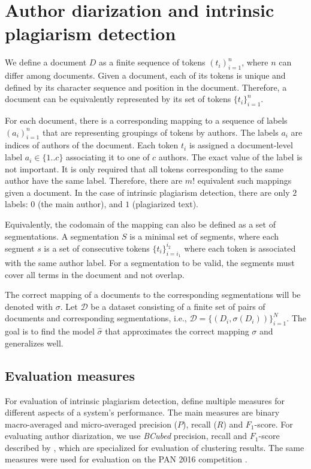 \documentclass[10pt, a4paper]{article}
\begin{document}
\section{Author diarization and intrinsic plagiarism detection} \label{sec:author-diraization}

We define a document $D$ as a finite sequence of tokens $(t_i)_{i=1}^n$, where $n$ can differ among documents. Given a document, each of its tokens is unique and defined by its character sequence and position in the document. Therefore, a document can be equivalently represented by its set of tokens $\{t_i\}_{i=1}^n$.

For each document, there is a corresponding mapping to a sequence of labels $(a_i)_{i=1}^n$ that are representing groupings of tokens by authors. The labels $a_i$ are indices of authors of the document. Each token $t_i$ is assigned a document-level label $a_i \in \{1..c\}$ associating it to one of $c$ authors. The exact value of the label is not important. It is only required that all tokens corresponding to the same author have the same label. Therefore, there are $m!$ equivalent such mappings given a document. In the case of intrinsic plagiarism detection, there are only $2$ labels: $0$ (the main author), and $1$ (plagiarized text).

Equivalently, the codomain of the mapping can also be defined as a set of segmentations. A segmentation $S$ is a minimal set of segments, where each segment $s$ is a set of consecutive tokens $\{t_i\}_{i=i_1}^{i_2}$ where each token is associated with the same author label. For a segmentation to be valid, the segments must cover all terms in the document and not overlap.

The correct mapping of a documents to the corresponding segmentations will be denoted with $\sigma$. Let $\mathcal{D}$ be a dataset consisting of a finite set of pairs of documents and corresponding segmentations, i.e., $\mathcal{D} = \{\left(D_i, \sigma(D_i)\right)\}_{i=1}^N$. The goal is to find the model $\hat{\sigma}$ that approximates the correct mapping $\sigma$ and generalizes well.

\subsection{Evaluation measures} \label{subsec:evaluation-measures}

For evaluation of intrinsic plagiarism detection, \citet{stein-2010} define multiple measures for different aspects of a system's performance. The main measures are binary macro-averaged and micro-averaged precision ($P$), recall ($R$) and $F_1$-score. For evaluating author diarization, we use \emph{BCubed} precision, recall and $F_1$-score described by \citet{amigo-2009}, which are specialized for evaluation of clustering results. The same measures were used for evaluation on the PAN 2016 competition \citep{rosso-2016}.
\end{document}
